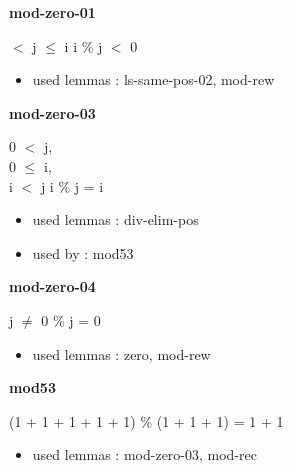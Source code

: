 \documentclass[a4paper]{article}
\begin{document}
\medskip

\bigskip

{\large\bf mod-zero-01}

\medskip

  $<$ j  $\le$ i \Imp \Not i \% j $<$ 0

\begin{itemize}


\item       used lemmas  : ls-same-pos-02, mod-rew

\end{itemize}

\medskip

\bigskip

{\large\bf mod-zero-03}

\medskip

0 $<$ j, \\
0 $\le$ i, \\
i $<$ j \Fol i \% j = i

\begin{itemize}


\item       used lemmas  : div-elim-pos
\item       used by      : mod53

\end{itemize}

\medskip

\bigskip

{\large\bf mod-zero-04}

\medskip

j $\neq$ 0  \% j = 0

\begin{itemize}


\item       used lemmas  : zero, mod-rew

\end{itemize}

\medskip

\bigskip

{\large\bf mod53}

\medskip

 \Fol (1 + 1 + 1 + 1 + 1) \% (1 + 1 + 1) = 1 + 1

\begin{itemize}


\item       used lemmas  : mod-zero-03, mod-rec

\end{itemize}
\end{document}
